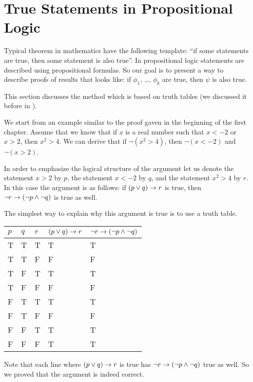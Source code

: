 \chapter{True Statements in Propositional Logic}
\label{chapter:propositional-truth}


Typical theorem in mathematics have the following template:
``if some statements are true, then some statement is also true''.
In propositional logic statements are described using propositional formulas.
So our goal is to present a way to describe proofs of results that looks like:
if $\phi_1$, \dots, $\phi_k$ are true, then $\psi$ is also true.

This section discusses the method which is based on truth tables (we discussed
it before in ).

We start from an example similar to
the proof gaven in the beginning of the first chapter. Assume that we know
that if $x$ is a real number such that $x < -2$ or $x > 2$, then $x^2 > 4$. We
can derive that if $\lnot (x^2 > 4)$, then $\lnot (x < -2)$ and $\lnot (x > 2)$.

In order to emphasize the logical structure of the argument let us denote
the statement $x > 2$ by $p$, the statement $x < -2$ by $q$, and the statement
$x^2 > 4$ by $r$. In this case the argument is as follows:
if $(p \lor q) \rightarrow r$ is true, then
$\lnot r \rightarrow (\lnot p \land \lnot q)$ is true as well.

The simplest way to explain why this argument is true is to use
a truth table.
\begin{center}
  \begin{tabular}{l l l l l}
    \toprule
    $p$ & $q$ & $r$ & $(p \lor q) \rightarrow r$ &
    $\lnot r \rightarrow (\lnot p \land \lnot q)$ \\
    \midrule
    T & T & T & T & T \\
    T & T & F & F & F \\
    T & F & T & T & T \\
    T & F & F & F & F \\
    F & T & T & T & T \\
    F & T & F & F & F \\
    F & F & T & T & T \\
    F & F & F & T & T \\
    \bottomrule
  \end{tabular}
\end{center}
Note that each line where $(p \lor q) \rightarrow r$ is true has
$\lnot r \rightarrow (\lnot p \land \lnot q)$ true as well. So we proved that
the argument is indeed correct.

